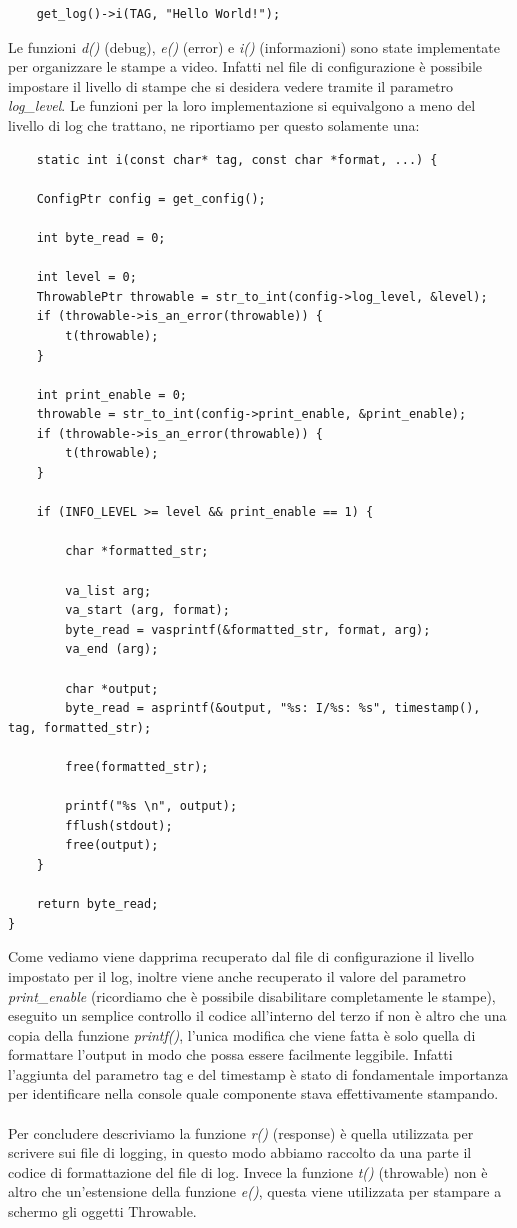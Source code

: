 \documentclass[italian]{tktltiki2}
\begin{document}
\begin{lstlisting}
	get_log()->i(TAG, "Hello World!");
\end{lstlisting}

Le funzioni \emph{d()} (debug), \emph{e()} (error) e \emph{i()} (informazioni) sono state implementate per organizzare le stampe a video. Infatti nel file di configurazione è possibile impostare il livello di stampe che si desidera vedere tramite il parametro \emph{log\_level}. Le funzioni per la loro implementazione si equivalgono a meno del livello di log che trattano, ne riportiamo per questo solamente una:

\begin{lstlisting}
	static int i(const char* tag, const char *format, ...) {

    ConfigPtr config = get_config();

    int byte_read = 0;

    int level = 0;
    ThrowablePtr throwable = str_to_int(config->log_level, &level);
    if (throwable->is_an_error(throwable)) {
        t(throwable);
    }

    int print_enable = 0;
    throwable = str_to_int(config->print_enable, &print_enable);
    if (throwable->is_an_error(throwable)) {
        t(throwable);
    }

    if (INFO_LEVEL >= level && print_enable == 1) {

        char *formatted_str;

        va_list arg;
        va_start (arg, format);
        byte_read = vasprintf(&formatted_str, format, arg);
        va_end (arg);

        char *output;
        byte_read = asprintf(&output, "%s: I/%s: %s", timestamp(), tag, formatted_str);

        free(formatted_str);

        printf("%s \n", output);
        fflush(stdout);
        free(output);
    }

    return byte_read;
}
\end{lstlisting}

Come vediamo viene dapprima recuperato dal file di configurazione il livello impostato per il log, inoltre viene anche recuperato il valore del parametro \emph{print\_enable} (ricordiamo che è possibile disabilitare completamente le stampe), eseguito un semplice controllo il codice all'interno del terzo if non è altro che una copia della funzione \emph{printf()}, l'unica modifica che viene fatta è solo quella di formattare l'output in modo che possa essere facilmente leggibile. Infatti l'aggiunta del parametro tag e del timestamp è stato di fondamentale importanza per identificare nella console quale componente stava effettivamente stampando.\\\\ Per concludere descriviamo la funzione \emph{r()} (response) è quella utilizzata per scrivere sui file di logging, in questo modo abbiamo raccolto da una parte il codice di formattazione del file di log. Invece la funzione \emph{t()} (throwable) non è altro che un'estensione della funzione \emph{e()}, questa viene utilizzata per stampare a schermo gli oggetti Throwable.
\end{document}
